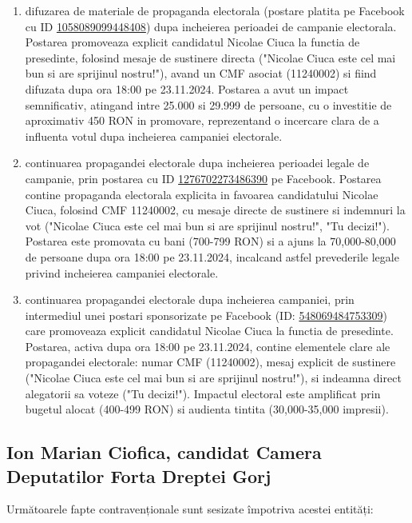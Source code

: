 \documentclass[a4paper,12pt]{article}
\begin{document}
\begin{enumerate}[leftmargin=*, label=\arabic*.)]
    \item difuzarea de materiale de propaganda electorala (postare platita pe Facebook cu ID \href{https://www.facebook.com/ads/library/?id=1058089099448408}{1058089099448408}) dupa incheierea perioadei de campanie electorala. Postarea promoveaza explicit candidatul Nicolae Ciuca la functia de presedinte, folosind mesaje de sustinere directa ("Nicolae Ciuca este cel mai bun si are sprijinul nostru!"), avand un CMF asociat (11240002) si fiind difuzata dupa ora 18:00 pe 23.11.2024. Postarea a avut un impact semnificativ, atingand intre 25.000 si 29.999 de persoane, cu o investitie de aproximativ 450 RON in promovare, reprezentand o incercare clara de a influenta votul dupa incheierea campaniei electorale.
    \item continuarea propagandei electorale dupa incheierea perioadei legale de campanie, prin postarea cu ID \href{https://www.facebook.com/ads/library/?id=1276702273486390}{1276702273486390} pe Facebook. Postarea contine propaganda electorala explicita in favoarea candidatului Nicolae Ciuca, folosind CMF 11240002, cu mesaje directe de sustinere si indemnuri la vot ("Nicolae Ciuca este cel mai bun si are sprijinul nostru!", "Tu decizi!"). Postarea este promovata cu bani (700-799 RON) si a ajuns la 70,000-80,000 de persoane dupa ora 18:00 pe 23.11.2024, incalcand astfel prevederile legale privind incheierea campaniei electorale.
    \item continuarea propagandei electorale dupa incheierea campaniei, prin intermediul unei postari sponsorizate pe Facebook (ID: \href{https://www.facebook.com/ads/library/?id=548069484753309}{548069484753309}) care promoveaza explicit candidatul Nicolae Ciuca la functia de presedinte. Postarea, activa dupa ora 18:00 pe 23.11.2024, contine elementele clare ale propagandei electorale: numar CMF (11240002), mesaj explicit de sustinere ("Nicolae Ciuca este cel mai bun si are sprijinul nostru!"), si indeamna direct alegatorii sa voteze ("Tu decizi!"). Impactul electoral este amplificat prin bugetul alocat (400-499 RON) si audienta tintita (30,000-35,000 impresii).
\end{enumerate}

\vspace{0.5cm}

\subsection{Ion Marian Ciofica, candidat Camera Deputatilor Forta Dreptei Gorj}
Următoarele fapte contravenționale sunt sesizate împotriva acestei entități:
\end{document}
